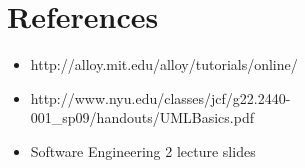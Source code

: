 \chapter{References}
\begin{itemize}
\item http://alloy.mit.edu/alloy/tutorials/online/
\item http://www.nyu.edu/classes/jcf/g22.2440-001\_sp09/handouts/UMLBasics.pdf
\item Software Engineering 2 lecture slides
\end{itemize}

